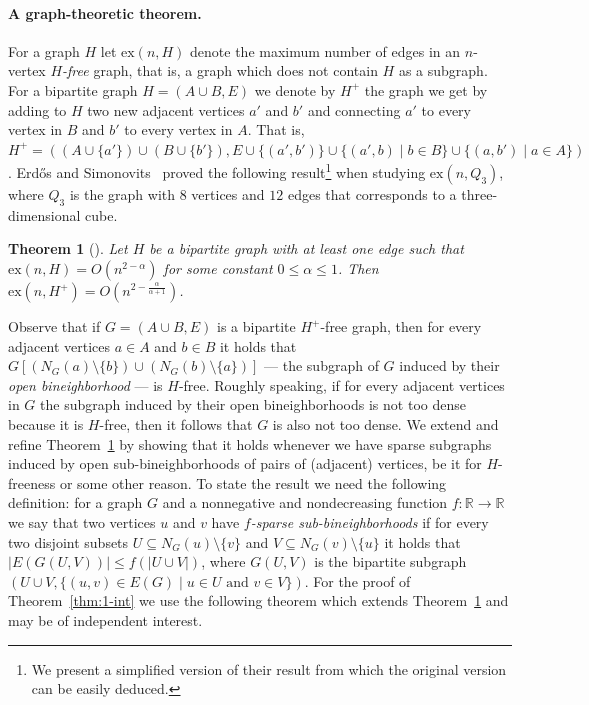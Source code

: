 \documentclass[11pt]{article}
\newtheorem{theorem}{Theorem}
\theoremstyle{definition}
\newcommand{\ex}{\mbox{ex}}
\begin{document}
\paragraph{A graph-theoretic theorem.}
For a graph $H$ let $\ex(n,H)$ denote the maximum number of edges in an $n$-vertex \emph{$H$-free} graph, that is, a graph which does not contain $H$ as a subgraph.
For a bipartite graph $H=\left(A\cup B,E\right)$ we denote by $H^+$ the graph we get by adding to $H$ two new adjacent vertices $a'$ and $b'$ and connecting $a'$ to every vertex in $B$ and $b'$ to every vertex in $A$.
That is, 
$H^+ = \left((A\cup \{a'\}) \cup (B \cup \{b'\}), E \cup \{(a',b')\} \cup \{(a',b) \mid b \in B\} \cup \{(a,b') \mid a \in A\} \right)$.
Erd\H{o}s and Simonovits~\cite{ES70} proved the following result\footnote{We present a simplified version of their result from which the original version can be easily deduced.} when studying $\ex(n,Q_3)$, where $Q_3$ is the graph with $8$ vertices and $12$ edges that corresponds to a three-dimensional cube.

\begin{theorem}[{\cite[Theorem 2]{ES70}}]\label{thm:erdos-simonovits}
	Let $H$ be a bipartite graph with at least one edge such that $\ex(n,H)=O(n^{2 -\alpha})$ for some constant $0\le\alpha \le 1$.
	Then $\ex(n,H^+) = O\left(n^{2-\frac{\alpha}{\alpha+1}}\right)$.
\end{theorem}
	
Observe that if $G=(A\cup B,E)$ is a bipartite $H^+$-free graph, then for every adjacent vertices $a \in A$ and $b \in B$ it holds that $G[(N_G(a)\setminus \{b\}) \cup (N_G(b)\setminus \{a\})]$ --- the subgraph of $G$ induced by their \emph{open bineighborhood} --- is $H$-free.
Roughly speaking, if for every adjacent vertices in $G$ the subgraph induced by their open bineighborhoods is not too dense because it is $H$-free, then it follows that $G$ is also not too dense.
We extend and refine Theorem~\ref{thm:erdos-simonovits} by showing that it holds whenever we have sparse subgraphs induced by open sub-bineighborhoods of pairs of (adjacent) vertices, be it for $H$-freeness or some other reason.
To state the result we need the following definition:
for a graph $G$ and a nonnegative and nondecreasing function $f:\mathbb{R} \rightarrow \mathbb{R}$ we say that two vertices $u$ and $v$ have \emph{$f$-sparse sub-bineighborhoods}
if for every two disjoint subsets $U \subseteq N_G(u) \setminus \{v\}$ and $V \subseteq N_G(v) \setminus \{u\}$ it holds that $|E(G(U,V))| \le f(|U \cup V|)$, where $G(U,V)$ is the bipartite subgraph $(U \cup V, \{(u,v) \in E(G) \mid u\in U \textrm{ and } v\in V\})$.
For the proof of Theorem~\ref{thm:1-int} we use the following theorem which extends Theorem~\ref{thm:erdos-simonovits} 
and may be of independent interest. 
\end{document}
